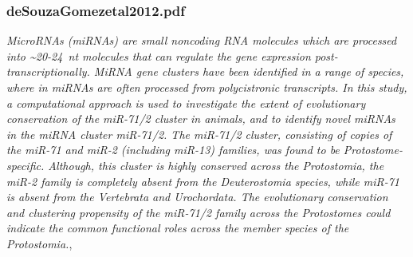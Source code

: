 \documentclass[graybox]{svmult}
\begin{document}
\subsubsection{deSouzaGomezetal2012.pdf}
\cite{DeSouzaGomes2013}
\textit{MicroRNAs (miRNAs) are small noncoding RNA molecules which are processed into {\~{}}20-24 nt molecules that can regulate the gene expression post-transcriptionally. MiRNA gene clusters have been identified in a range of species, where in miRNAs are often processed from polycistronic transcripts. In this study, a computational approach is used to investigate the extent of evolutionary conservation of the miR-71/2 cluster in animals, and to identify novel miRNAs in the miRNA cluster miR-71/2. The miR-71/2 cluster, consisting of copies of the miR-71 and miR-2 (including miR-13) families, was found to be Protostome-specific. Although, this cluster is highly conserved across the Protostomia, the miR-2 family is completely absent from the Deuterostomia species, while miR-71 is absent from the Vertebrata and Urochordata. The evolutionary conservation and clustering propensity of the miR-71/2 family across the Protostomes could indicate the common functional roles across the member species of the Protostomia.},
\end{document}
